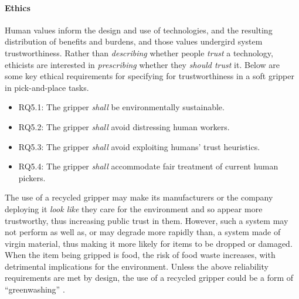 \documentclass[lettersize,journal]{IEEEtran}
\begin{document}

\paragraph{Ethics}\label{ethics}
Human values inform the design and use of technologies, and the resulting distribution of benefits and burdens, and those values undergird system trustworthiness. Rather than \emph{describing} whether people \emph{trust} a technology, ethicists are interested in \emph{prescribing} whether they \emph{should trust} it. Below are some key ethical requirements for specifying for trustworthiness in a soft gripper in pick-and-place tasks.
\begin{itemize}
	\item RQ5.1: The gripper \emph{shall} 
        be environmentally sustainable. 
        \item RQ5.2: The gripper \emph{shall} avoid distressing human workers.
        \item RQ5.3: The gripper \emph{shall} avoid exploiting humans’ trust heuristics.
        \item RQ5.4: The gripper \emph{shall} accommodate fair treatment of current human pickers.
\end{itemize}

The use of a recycled gripper may make its manufacturers or the company deploying it \emph{look like} they care for the environment and so appear more trustworthy, thus increasing public trust in them. However, such a system may not perform as well as, or may degrade more rapidly than, a system made of virgin material, thus making it more likely for items to be dropped or damaged. When the item being gripped is food, the risk of food waste increases, with detrimental implications for the environment. Unless the above reliability requirements  are met by design, the use of a recycled gripper could be a form of “greenwashing” \cite{delmas2011drivers}.    
\end{document}
